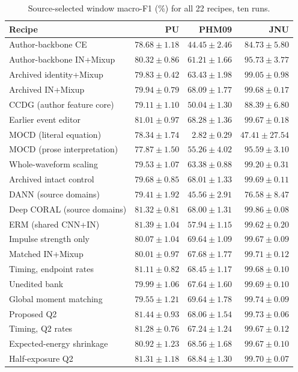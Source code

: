 \begin{table}[pos=htbp]
\centering\footnotesize
\caption{Source-selected window macro-F1 (\%) for all 22 recipes, ten runs.}
\label{tab:all-selected-macro_f1}
\begin{tabular}{lrrr}
\toprule
Recipe & PU & PHM09 & JNU\\
\midrule
Author-backbone CE & $78.68\pm1.18$ & $44.45\pm2.46$ & $84.73\pm5.80$\\
Author-backbone IN+Mixup & $80.32\pm0.86$ & $61.21\pm1.66$ & $95.73\pm3.77$\\
Archived identity+Mixup & $79.83\pm0.42$ & $63.43\pm1.98$ & $99.05\pm0.98$\\
Archived IN+Mixup & $79.94\pm0.79$ & $68.09\pm1.77$ & $99.68\pm0.17$\\
CCDG (author feature core) & $79.11\pm1.10$ & $50.04\pm1.30$ & $88.39\pm6.80$\\
Earlier event editor & $81.01\pm0.97$ & $68.28\pm1.36$ & $99.67\pm0.18$\\
MOCD (literal equation) & $78.34\pm1.74$ & $2.82\pm0.29$ & $47.41\pm27.54$\\
MOCD (prose interpretation) & $77.87\pm1.50$ & $55.26\pm4.02$ & $95.59\pm3.10$\\
Whole-waveform scaling & $79.53\pm1.07$ & $63.38\pm0.88$ & $99.20\pm0.31$\\
Archived intact control & $79.68\pm0.85$ & $68.01\pm1.33$ & $99.69\pm0.11$\\
DANN (source domains) & $79.41\pm1.92$ & $45.56\pm2.91$ & $76.58\pm8.47$\\
Deep CORAL (source domains) & $81.32\pm0.81$ & $68.00\pm1.31$ & $99.86\pm0.08$\\
ERM (shared CNN+IN) & $81.39\pm1.04$ & $57.94\pm1.15$ & $99.62\pm0.20$\\
Impulse strength only & $80.07\pm1.04$ & $69.64\pm1.09$ & $99.67\pm0.09$\\
Matched IN+Mixup & $80.01\pm0.97$ & $67.68\pm1.77$ & $99.71\pm0.12$\\
Timing, endpoint rates & $81.11\pm0.82$ & $68.45\pm1.17$ & $99.68\pm0.10$\\
Unedited bank & $79.99\pm1.06$ & $67.64\pm1.60$ & $99.69\pm0.10$\\
Global moment matching & $79.55\pm1.21$ & $69.64\pm1.78$ & $99.74\pm0.09$\\
Proposed Q2 & $81.44\pm0.93$ & $68.06\pm1.54$ & $99.73\pm0.06$\\
Timing, Q2 rates & $81.28\pm0.76$ & $67.24\pm1.24$ & $99.67\pm0.12$\\
Expected-energy shrinkage & $80.92\pm1.23$ & $68.56\pm1.68$ & $99.67\pm0.10$\\
Half-exposure Q2 & $81.31\pm1.18$ & $68.84\pm1.30$ & $99.70\pm0.07$\\
\bottomrule
\end{tabular}
\end{table}
